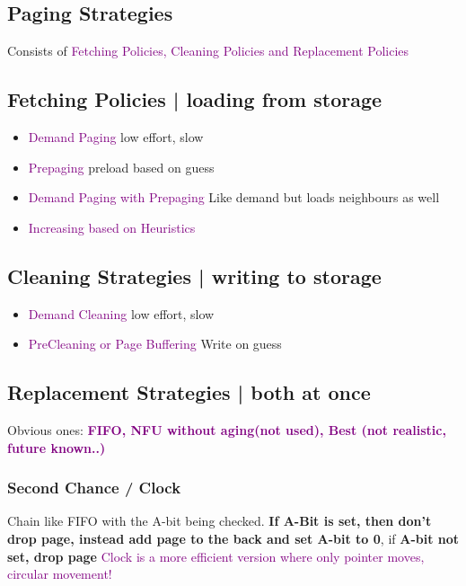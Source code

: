 \documentclass[main.tex,fontsize=7pt,paper=a4,paper=landscape,DIV=calc,]{scrartcl}
\begin{document}
\begin{multicols*}{4}
\subsection{Paging Strategies}
Consists of \textcolor{purple}{Fetching Policies, Cleaning Policies and Replacement Policies} 

\subsection{Fetching Policies | loading from storage}
\begin{itemize}
\item \textcolor{purple}{Demand Paging} low effort, slow
\item \textcolor{purple}{Prepaging} preload based on guess
\item \textcolor{purple}{Demand Paging with Prepaging}\newline
  Like demand but loads neighbours as well
\item \textcolor{purple}{Increasing based on Heuristics}
\end{itemize} 

\subsection{Cleaning Strategies | writing to storage}
\begin{itemize}
\item \textcolor{purple}{Demand Cleaning} low effort, slow
\item \textcolor{purple}{PreCleaning or Page Buffering} Write on guess
\end{itemize} 

\subsection{Replacement Strategies | both at once}
Obvious ones: \textbf{\textcolor{purple}{FIFO, NFU without aging(not used), Best (not realistic, future known..)}}
\subsubsection{Second Chance / Clock}
Chain like FIFO with the A-bit being checked.\newline
\textbf{If A-Bit is set, then don't drop page, instead add page to the back and set A-bit to 0}, if \textbf{A-bit not set, drop page}\newline
\textcolor{purple}{Clock is a more efficient version where only pointer moves, circular movement!}\newline


\end{multicols*}
\end{document}
